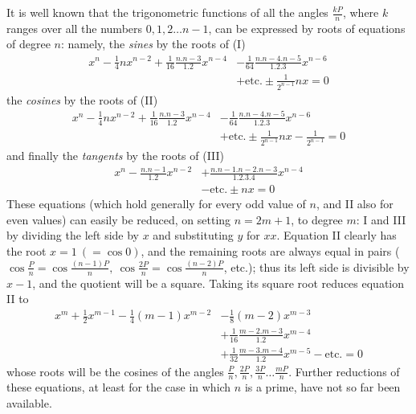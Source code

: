 It is well known that the trigonometric functions of all the angles \(\frac{kP}n\), where \(k\) ranges over all the numbers \(0,\allowbreak 1,\allowbreak 2\ldots n-1\), can be expressed by roots of equations of degree \(n\): namely, the \textit{sines} by the roots of (I) \[\begin{aligned}
x^n-\frac14nx^{n-2}+\frac1{16}\frac{n.n-3}{1.2}x^{n-4}
&-\frac1{64}\frac{n.n-4.n-5}{1.2.3}x^{n-6}\\
&+\mathrm{etc.}\pm\frac1{2^{n-1}}nx=0
\end{aligned}\] the \textit{cosines} by the roots of (II) \[\begin{aligned}
x^n-\frac14nx^{n-2}+\frac1{16}\frac{n.n-3}{1.2}x^{n-4}
&-\frac1{64}\frac{n.n-4.n-5}{1.2.3}x^{n-6}\\
&+\mathrm{etc.}\pm\frac1{2^{n-1}}nx-\frac1{2^{n-1}}=0
\end{aligned}\] and finally the \textit{tangents} by the roots of (III) \[\begin{aligned}
x^n-\frac{n.n-1}{1.2}x^{n-2}&+\frac{n.n-1.n-2.n-3}{1.2.3.4}x^{n-4}\\
&-\mathrm{etc.}\pm nx=0
\end{aligned}\] These equations (which hold generally for every odd value of \(n\), and II also for even values) can easily be reduced, on setting \(n=2m+1\), to degree \(m\): I and III by dividing the left side by \(x\) and substituting \(y\) for \(xx\). Equation II clearly has the root \(x=1\ (=\cos0)\), and the remaining roots are always equal in pairs (\(\cos\frac Pn=\cos\frac{(n-1)P}n,\allowbreak \ \cos\frac{2P}n=\cos\frac{(n-2)P}n\), etc.); thus its left side is divisible by \(x-1\), and the quotient will be a square. Taking its square root reduces equation II to \[\begin{aligned}
x^m+\frac12x^{m-1}-\frac14(m-1)x^{m-2}&-\frac18(m-2)x^{m-3}\\
&+\frac1{16}\frac{m-2.m-3}{1.2}x^{m-4}\\
&+\frac1{32}\frac{m-3.m-4}{1.2}x^{m-5}-\mathrm{etc.}=0
\end{aligned}\] whose roots will be the cosines of the angles \(\frac Pn,\allowbreak \frac{2P}n,\allowbreak \frac{3P}n\ldots\frac{mP}n\). Further reductions of these equations, at least for the case in which \(n\) is a prime, have not so far been available.

